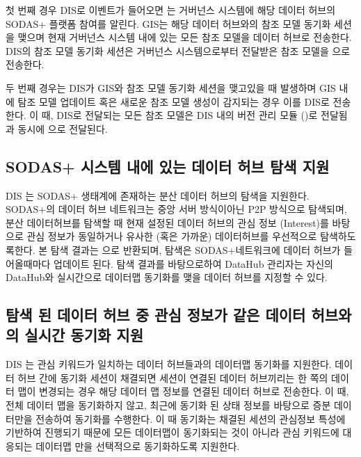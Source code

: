 \documentclass[a4paper,10pt,english]{sphinxmanual}
\begin{document}
\sphinxAtStartPar
첫 번째 경우 DIS로  이벤트가 들어오면 {\hyperref[\detokenize{RMSync:rmsyncmodule}]{}} 는 거버넌스 시스템에 해당 데이터 허브의 SODAS+ 플랫폼 참여를 알린다.
GIS는 해당 데이터 허브와의 참조 모델 동기화 세션을 맺으며 현재 거버넌스 시스템 내에 있는 모든 참조 모델을 데이터 허브로 전송한다.
DIS의 참조 모델 동기화 세션은 거버넌스 시스템으로부터 전달받은 참조 모델을  으로 전송한다.

\sphinxAtStartPar
두 번째 경우는 DIS가 GIS와 참조 모델 동기화 세션을 맺고있을 때 발생하며 GIS 내에 탐조 모델 업데이트 혹은 새로운 참조 모델 생성이 감지되는 경우
이를 DIS로 전송한다.
이 때, DIS로 전달되는 모든 참조 모델은 DIS 내의 버전 관리 모듈 ({\hyperref[\detokenize{VersionControl:versioncontrolmodule}]{}})로 전달됨과 동시에  으로 전달된다.


\subsection{SODAS+ 시스템 내에 있는 데이터 허브 탐색 지원}
\label{\detokenize{intro:sodas}}
\sphinxAtStartPar
DIS 는 SODAS+ 생태계에 존재하는 분산 데이터 허브의 탐색을 지원한다.
SODAS+의 데이터 허브 네트워크는 중앙 서버 방식이아닌 P2P 방식으로 탐색되며,
분산 데이터허브를 탐색할 때 현재 설정된 데이터 허브의 관심 정보 (Interest)를 바탕으로
관심 정보가 동일하거나 유사한 (혹은 가까운) 데이터허브를 우선적으로 탐색하도록한다.
본 탐색 결과는  으로 반환되며, 탐색은 SODAS+네트워크에 데이터 허브가 들어올때마다
업데이트 된다. 탐색 결과를 바탕으로하여 DataHub 관리자는 자신의 DataHub와 실시간으로 데이터맵 동기화를 맺을
데이터 허브를 지정할 수 있다.


\begin{DUlineblock}{0em}
\item[] 
\item[] 
\end{DUlineblock}


\subsection{탐색 된 데이터 허브 중 관심 정보가 같은 데이터 허브와의 실시간 동기화 지원}
\label{\detokenize{intro:id3}}
\sphinxAtStartPar
DIS 는 관심 키워드가 일치하는 데이터 허브들과의 데이터맵 동기화를 지원한다.
데이터 허브 간에 동기화 세션이 채결되면 세션이 연결된 데이터 허브끼리는 한 쪽의 데이터 맵이 변경되는 경우
해당 데이터 맵 정보를 연결된 데이터 허브로 전송한다. 이 때, 전체 데이터 맵을 동기화하지 않고,
최근에 동기화 된 상태 정보를 바탕으로 증분 데이터만을 전송하여 동기화를 수행한다.
이 때 동기화는 채결된 세션의 관심정보 특성에 기반하여 진행되기 때문에 모든 데이터맵이 동기화되는 것이 아니라
관심 키워드에 대응되는 데이터맵 만을 선택적으로 동기화하도록 지원한다.
\end{document}
